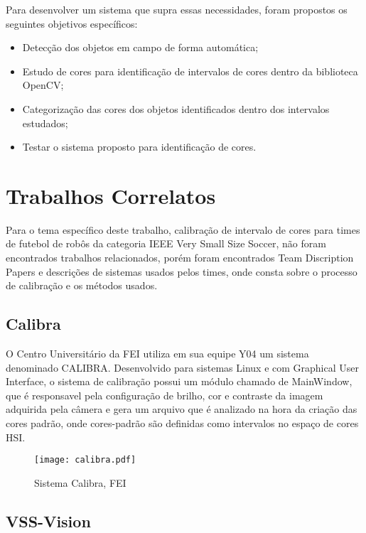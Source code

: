 Para desenvolver um sistema que supra essas necessidades, foram propostos os seguintes objetivos específicos:

\begin{itemize}
	
	\item Detecção dos objetos em campo de forma automática; 
	\item Estudo de cores para identificação de intervalos de cores dentro da biblioteca OpenCV;
	\item Categorização das cores dos objetos identificados dentro dos intervalos estudados;
	\item Testar o sistema proposto para identificação de cores.
	
	
\end{itemize}

\newpage

\section{Trabalhos Correlatos}
Para o tema específico deste trabalho, calibração de intervalo de cores para times de futebol de robôs da categoria IEEE Very Small Size Soccer, não foram encontrados trabalhos relacionados, porém foram encontrados Team Discription Papers e descrições de sistemas usados pelos times, onde consta sobre o processo de calibração e os métodos usados\cite{Penharbel:2004}\cite{Rosa:2015}\cite{VSSVision}\cite{PenharbelTime}.

\subsection{Calibra}
O Centro Universitário da FEI\cite{PenharbelTime} utiliza em sua equipe Y04 um sistema denominado CALIBRA\cite{Penharbel:2004}. Desenvolvido para sistemas Linux e com Graphical User Interface\cite{Penharbel:2004}, o sistema de calibração possui um módulo chamado de MainWindow, que é responsavel pela configuração de brilho, cor e contraste da imagem adquirida pela câmera e gera um arquivo que é analizado na hora da criação das cores padrão\cite{PenharbelTime}, onde cores-padrão são definidas como intervalos no espaço de cores HSI\cite{PenharbelTime}.
\begin{figure}[H]
	\centering
	\texttt{[image: calibra.pdf]}
	\caption{Sistema Calibra, FEI \cite{Penharbel:2004}}
	\label{Calibra}
\end{figure}

\subsection{VSS-Vision}

